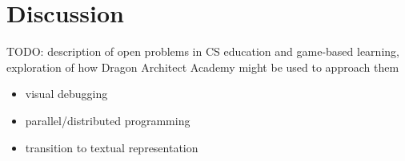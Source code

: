 \documentclass{sig-alternate}
\newcommand{\TODO}[1]{{\color{red} TODO: #1}}
\newcommand{\gametitle}{{\color{RoyalPurple} Dragon Architect Academy}}
\begin{document}
\section{Discussion}
\TODO{description of open problems in CS education and game-based learning, exploration of how \gametitle{} might be used to approach them}
\begin{itemize}
\item visual debugging
\item parallel/distributed programming
\item transition to textual representation
\end{itemize}



 
\end{document}

